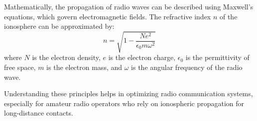 Mathematically, the propagation of radio waves can be described using Maxwell's equations, which govern electromagnetic fields. The refractive index \( n \) of the ionosphere can be approximated by:
\[
n = \sqrt{1 - \frac{Ne^2}{\epsilon_0 m \omega^2}}
\]
where \( N \) is the electron density, \( e \) is the electron charge, \( \epsilon_0 \) is the permittivity of free space, \( m \) is the electron mass, and \( \omega \) is the angular frequency of the radio wave.

Understanding these principles helps in optimizing radio communication systems, especially for amateur radio operators who rely on ionospheric propagation for long-distance contacts.

